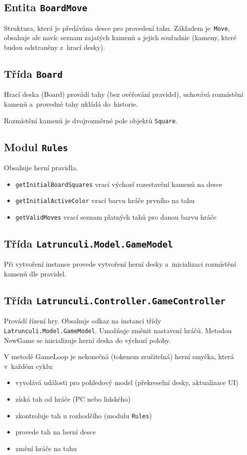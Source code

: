 \documentclass[12pt]{article}
\begin{document}
\subsection{Entita \texttt{BoardMove}}
Struktura, která je předávána desce pro provedení tahu. Základem je~\texttt{Move}, obsahuje ale navíc seznam zajatých kamenů a jejich souřadnic (kameny, které budou odstraněny z~hrací desky).

\subsection{Třída \texttt{Board}}
Hrací deska (Board) provádí tahy (bez ověřování pravidel), uchovává rozmístění kamenů a~provedné tahy ukládá do~historie.

Rozmístění kamenů je dvojrozměrné pole objektů \texttt{Square}.

\subsection{Modul \texttt{Rules}}
Obsahuje herní pravidla.
	\begin{itemize}  
		\item\texttt{getInitialBoardSquares} vrací výchozí rozestavění kamenů na desce
		\item\texttt{getInitialActiveColor} vrací barvu hráče prvního na tahu
		\item\texttt{getValidMoves} vrací seznam platných tahů pro danou barvu hráče
	\end{itemize}

\subsection{Třída \texttt{Latrunculi.Model.GameModel}}
Při vytvoření instance provede vytvoření herní desky a~inicializaci rozmístění kamenů dle pravidel.

\subsection{Třída \texttt{Latrunculi.Controller.GameController}}
Provádí řízení hry. Obsahuje odkaz na instanci třídy \texttt{Latrunculi.Model.GameModel}.
Umožňuje změnit nastavení hráčů. Metodou NewGame se inicializuje herní deska do výchozí polohy.

V metodě GameLoop je nekonečná (tokenem zrušitelná) herní smyčka, která v~každém cyklu:
	\begin{itemize}  
		\item vyvolává události pro pohledový model (překreselní desky, aktualizace UI)
		\item získá tah od hráče (PC nebo lidského)
		\item zkontroluje tah u rozhodčího (modulu \texttt{Rules})
		\item provede tah na herní desce
		\item změní hráče na tahu
	\end{itemize}
\end{document}
